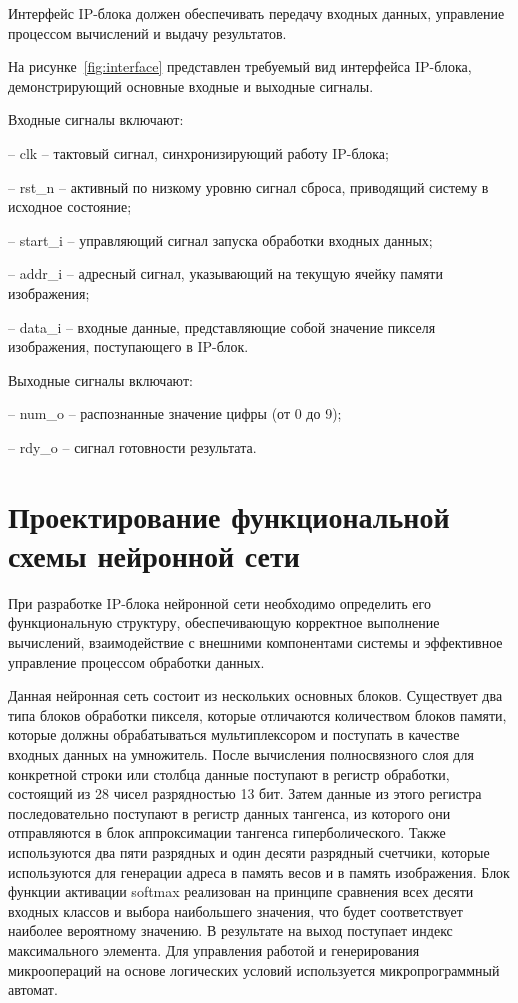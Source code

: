 Интерфейс IP-блока должен обеспечивать передачу входных данных, управление 
процессом вычислений и выдачу результатов.

На рисунке~\ref{fig:interface} представлен требуемый вид интерфейса 
IP-блока, демонстрирующий основные входные и выходные сигналы.

Входные сигналы включают:

– clk – тактовый сигнал, синхронизирующий работу IP-блока;

– rst\_n – активный по низкому уровню сигнал сброса, приводящий систему в исходное 
состояние;

– start\_i – управляющий сигнал запуска обработки входных данных;

– addr\_i – адресный сигнал, указывающий на текущую ячейку памяти изображения;

– data\_i – входные данные, представляющие собой значение пикселя изображения, 
поступающего в IP-блок.

Выходные сигналы включают:

– num\_o – распознанные значение цифры (от 0 до 9);

– rdy\_o – сигнал готовности результата.


\section{Проектирование функциональной схемы нейронной сети}
\hspace*{12.5 mm}При разработке IP-блока нейронной сети необходимо определить 
его функциональную структуру, обеспечивающую корректное выполнение вычислений, 
взаимодействие с внешними компонентами системы и эффективное управление 
процессом обработки данных.

Данная нейронная сеть состоит из нескольких основных блоков. Существует два 
типа блоков обработки пикселя, которые отличаются количеством блоков памяти,
которые должны обрабатываться мультиплексором и поступать в качестве входных 
данных на умножитель.
После вычисления полносвязного слоя для конкретной строки или столбца данные 
поступают в регистр обработки, состоящий из 28 чисел разрядностью 13 бит. 
Затем данные из этого регистра последовательно поступают в регистр данных 
тангенса, из которого они отправляются в блок аппроксимации тангенса 
гиперболического.
Также используются два пяти разрядных и один десяти разрядный счетчики, которые
используются для генерации адреса в память весов и в память изображения.
Блок функции активации softmax реализован на принципе сравнения всех десяти 
входных классов и выбора наибольшего значения, что будет соответствует наиболее
вероятному значению. В результате на выход поступает индекс максимального 
элемента.
Для управления работой и генерирования микроопераций на основе логических 
условий используется микропрограммный автомат.

